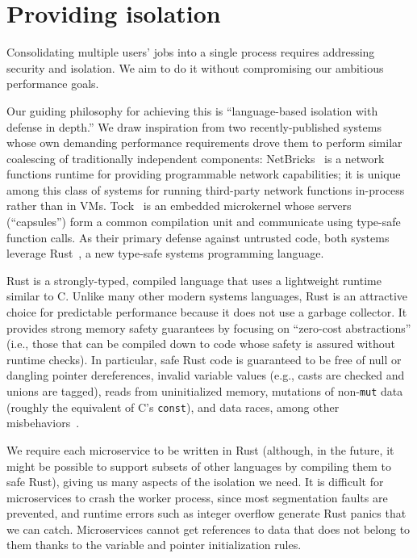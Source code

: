 \section{Providing isolation}
\label{sec:isolation}

Consolidating multiple users' jobs into a single process requires
addressing security and isolation. We aim to do it without
compromising our ambitious performance goals.

Our guiding philosophy for achieving this is ``language-based isolation with defense
in depth.'' We draw inspiration from two recently-published systems whose own
demanding performance requirements drove them to perform similar coalescing of
traditionally independent components:  NetBricks~\cite{Panda2016} is a network
functions runtime for providing programmable network capabilities; it is unique among
this class of systems for running third-party network functions in-process rather
than in VMs.  Tock~\cite{Levy2017} is an embedded microkernel whose servers
(``capsules'') form a common compilation unit and communicate using type-safe
function calls.  As their primary defense against untrusted code, both systems
leverage Rust~\cite{www-rustlang}, a new type-safe systems programming language.


Rust is a strongly-typed, compiled language that uses a lightweight runtime
similar to C.  Unlike many other modern systems languages, Rust is an
attractive choice for predictable performance because it does not use
a garbage collector.  It provides strong memory safety
guarantees by focusing on ``zero-cost abstractions'' (i.e., those that can be
compiled down to code whose safety is assured without runtime checks).  In
particular, safe Rust code is guaranteed to be free of null or dangling pointer
dereferences, invalid variable values (e.g., casts are checked and unions are
tagged), reads from uninitialized memory, mutations of non-\texttt{mut} data (roughly
the equivalent of C's \texttt{const}), and data races, among other
misbehaviors~\cite{www-rustlang-ub}.

We require each microservice to be written in Rust (although, in the future, it
might be possible to support subsets of other languages by compiling them to safe
Rust), giving us many aspects of the isolation we need.  It is difficult for
microservices to crash the worker process, since most segmentation faults are
prevented, and runtime errors such as integer overflow generate Rust panics that we
can catch.  Microservices cannot get references to data that does not belong to them
thanks to the variable and pointer initialization rules.
